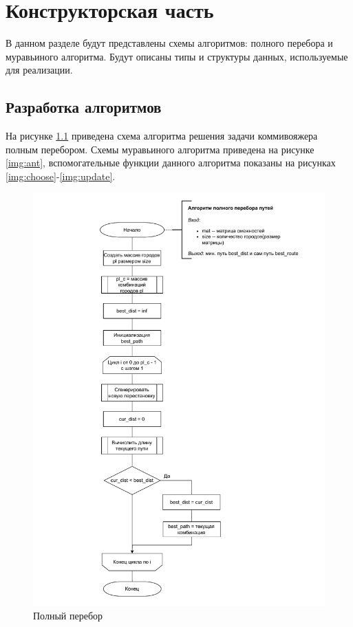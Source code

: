 \chapter{Конструкторская часть}

В данном разделе будут представлены схемы алгоритмов: полного перебора и муравьиного алгоритма. Будут описаны типы и структуры данных, используемые для реализации.

\section{Разработка алгоритмов}

На рисунке \ref{img:brute} приведена схема алгоритма решения задачи коммивояжера полным перебором. Схемы муравьиного алгоритма приведена на рисунке \ref{img:ant}, вспомогательные функции данного алгоритма показаны на рисунках \ref{img:choose}-\ref{img:update}.

\begin{figure}[H]
	\begin{center}
		\includegraphics[scale=0.6]{img/brute_force.pdf}
	\end{center}
	\captionsetup{justification=centering}
	\caption{Полный перебор}
	\label{img:brute}
\end{figure}

